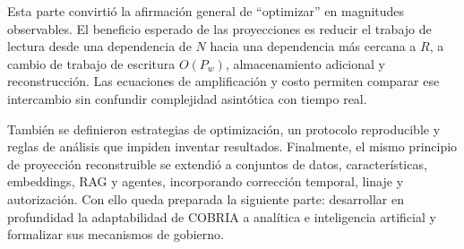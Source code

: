 Esta parte convirtió la afirmación general de ``optimizar'' en magnitudes observables.
El beneficio esperado de las proyecciones es reducir el trabajo de lectura desde una
dependencia de $N$ hacia una dependencia más cercana a $R$, a cambio de trabajo de
escritura $O(P_w)$, almacenamiento adicional y reconstrucción. Las ecuaciones de
amplificación y costo permiten comparar ese intercambio sin confundir complejidad
asintótica con tiempo real.

También se definieron estrategias de optimización, un protocolo reproducible y reglas
de análisis que impiden inventar resultados. Finalmente, el mismo principio de
proyección reconstruible se extendió a conjuntos de datos, características, embeddings, RAG y
agentes, incorporando corrección temporal, linaje y autorización. Con ello queda
preparada la siguiente parte: desarrollar en profundidad la adaptabilidad de COBRIA a
analítica e inteligencia artificial y formalizar sus mecanismos de gobierno.
